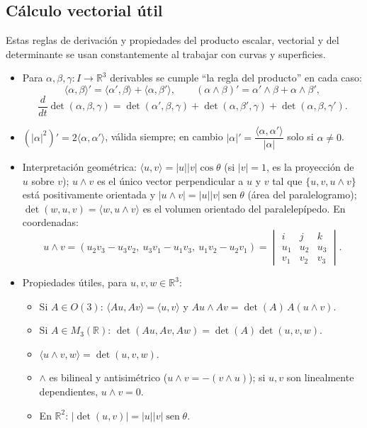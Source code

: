 \documentclass[11pt]{article}
\DeclareMathOperator{\sen}{sen}
\theoremstyle{plain}
\theoremstyle{definition}
\theoremstyle{remark}
\begin{document}
\subsection{Cálculo vectorial útil}

Estas reglas de derivación y propiedades del producto escalar, vectorial y del determinante se usan constantemente al trabajar con curvas y superficies.

\begin{itemize}
\item Para $\alpha,\beta,\gamma:I\to\mathbb{R}^3$ derivables se cumple ``la regla del producto'' en cada caso:
\[
\langle\alpha,\beta\rangle'=\langle\alpha',\beta\rangle+\langle\alpha,\beta'\rangle, \qquad
(\alpha\land\beta)'=\alpha'\land\beta+\alpha\land\beta',
\]
\[
\frac{d}{dt}\det(\alpha,\beta,\gamma)=\det(\alpha',\beta,\gamma)+\det(\alpha,\beta',\gamma)+\det(\alpha,\beta,\gamma').
\]
\item $(|\alpha|^2)'=2\langle\alpha,\alpha'\rangle$, válida siempre; en cambio $|\alpha|'=\dfrac{\langle\alpha,\alpha'\rangle}{|\alpha|}$ solo si $\alpha\neq0$.
\item Interpretación geométrica: $\langle u,v\rangle=|u||v|\cos\theta$ (si $|v|=1$, es la proyección de $u$ sobre $v$); $u\land v$ es el único vector perpendicular a $u$ y $v$ tal que $\{u,v,u\land v\}$ está positivamente orientada y $|u\land v|=|u||v|\sen\theta$ (área del paralelogramo); $\det(w,u,v)=\langle w,u\land v\rangle$ es el volumen orientado del paralelepípedo. En coordenadas:
\[
u\land v=(u_2v_3-u_3v_2,\ u_3v_1-u_1v_3,\ u_1v_2-u_2v_1) = 
\begin{vmatrix}
    i & j & k\\
    u_1 & u_2 & u_3 \\
    v_1 & v_2 & v_3
\end{vmatrix}.
\]
\item Propiedades útiles, para $u,v,w\in\mathbb{R}^3$:
\begin{itemize}
\item Si $A\in O(3)$: $\langle Au,Av\rangle=\langle u,v\rangle$ y $Au\land Av=\det(A)\,A(u\land v)$.
\item Si $A\in M_3(\mathbb{R})$: $\det(Au,Av,Aw)=\det(A)\det(u,v,w)$.
\item $\langle u\land v,w\rangle=\det(u,v,w)$.
\item $\land$ es bilineal y antisimétrico ($u\land v=-(v\land u)$); si $u,v$ son linealmente dependientes, $u\land v=0$.
\item En $\mathbb{R}^2$: $|\det(u,v)|=|u||v|\sen\theta$.
\end{itemize}
\end{itemize}
\end{document}
